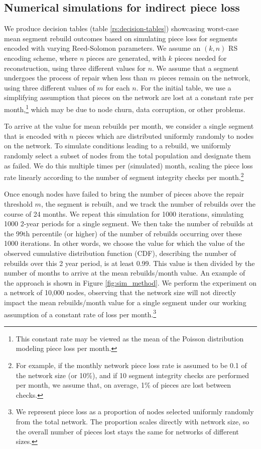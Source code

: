 
\subsection{Numerical simulations for indirect piece loss}\label{sec:RS-sim}

We produce decision tables (table \ref{rs:decision-tables}) showcasing
worst-case mean segment rebuild outcomes based on simulating piece loss for segments encoded with varying Reed-Solomon parameters.
We assume an $(k,n)$ RS encoding scheme, where $n$ pieces are generated, with
$k$ pieces needed for reconstruction, using three different values for $n$.
We assume that a segment undergoes the process of repair when less than $m$ pieces remain on the network, using three different values of $m$ for each $n$.
For the initial table, we use a simplifying assumption that pieces on the network are lost at a constant rate per month,\footnote{This constant rate may be viewed as the mean of the Poisson distribution modeling piece loss per month.} which may be due to node churn, data corruption, or other problems.

To arrive at the value for mean rebuilds per month, we consider a single segment that is encoded with $n$ pieces which are distributed uniformly randomly to nodes on the network. To simulate conditions leading to a rebuild, we uniformly randomly select a subset of nodes from the total population and designate them as failed. We do this multiple times per (simulated) month, scaling the piece loss rate linearly according to the number of segment integrity checks per month.\footnote{
For example, if the monthly network piece loss rate is assumed to be 0.1 of the network size (or 10\%), and if 10 segment integrity checks are performed per month, we assume that, on average, 1\% of pieces are lost between checks.}

Once enough nodes have failed to bring the number of pieces above the repair threshold $m$, the segment is rebuilt, and we track the number of rebuilds over the course of 24 months.
We repeat this simulation for 1000 iterations, simulating 1000 2-year periods for a single segment. We then take the number of rebuilds at the 99th percentile (or higher) of the number of rebuilds occurring over these 1000 iterations. In other words, we choose the value for which the value of the observed cumulative distribution function (CDF), describing the number of rebuilds over this 2 year period, is at least 0.99. This value is then divided by the number of months to arrive at the mean rebuilds/month value. An example of the approach is shown in Figure \ref{fig:sim_method}. We perform the experiment on a network of 10,000 nodes, observing that the network size will not directly impact the mean rebuilds/month value for a single segment under our working assumption of a constant rate of loss per month.\footnote{We represent piece loss as a proportion of nodes selected uniformly randomly from the total network. The proportion scales directly with network size, so the overall number of pieces lost stays the same for networks of different sizes.}

